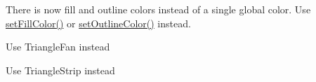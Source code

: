 \begin{DoxyRefList}
%
There is now fill and outline colors instead of a single global color. Use \mbox{\hyperlink{classsf_1_1Text_ab7bb3babac5a6da1802b2c3e1a3e6dcc}{set\+Fill\+Color()}} or \mbox{\hyperlink{classsf_1_1Text_aa19ec69c3b894e963602a6804ca68fe4}{set\+Outline\+Color()}} instead. 
\item[Member \mbox{\hyperlink{group__graphics_gga5ee56ac1339984909610713096283b1ba5338a2c6d922151fe50f235036af8a20}{sf\+::Triangles\+Fan}} ]\label{deprecated__deprecated000008}%
%
Use Triangle\+Fan instead  
\item[Member \mbox{\hyperlink{group__graphics_gga5ee56ac1339984909610713096283b1ba66643dbbb24bbacb405973ed80eebae0}{sf\+::Triangles\+Strip}} ]\label{deprecated__deprecated000007}%
%
Use Triangle\+Strip instead 
\end{DoxyRefList}